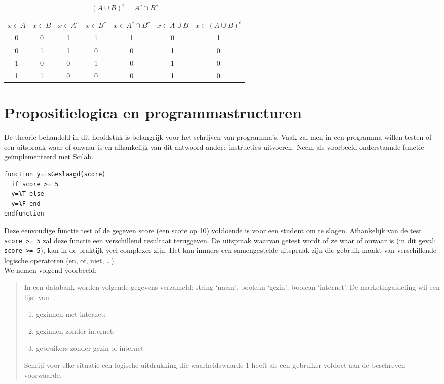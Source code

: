 \begin{table}
\caption{$(A\cup B)^c=A^c\cap B^c$} \label{tbl:gelijkeVerzamelingen}
\begin{tabular}{ccccccc}
\toprule
$x\in A$ & $x\in B$ & $x\in A^c$ & $x\in B^c$ & $x\in A^c\cap B^c$ & $x\in A\cup B$ & $x\in (A\cup B)^c$ \\ 
\midrule
0 & 0 & 1 & 1 & 1 & 0 & 1 \\ 
0 & 1 & 1 & 0 & 0 & 1 & 0 \\ 
1 & 0 & 0 & 1 & 0 & 1 & 0 \\ 
1 & 1 & 0 & 0 & 0 & 1 & 0 \\ 
\bottomrule
\end{tabular} 
\end{table}

\section{Propositielogica en programmastructuren}

De theorie behandeld in dit hoofdstuk is belangrijk voor het schrijven van programma’s. Vaak zal men in een programma willen testen of een uitspraak waar of onwaar is en afhankelijk van dit antwoord andere instructies uitvoeren.
Neem als voorbeeld onderstaande functie geïmplementeerd met Scilab.
\begin{lstlisting}
function y=isGeslaagd(score) 
  if score >= 5
  y=%T else
  y=%F end
endfunction
\end{lstlisting}
Deze eenvoudige functie test of de gegeven score (een score op 10) voldoende is voor een student om te slagen. Afhankelijk van de test \verb+score >= 5+ zal deze functie een verschillend resultaat teruggeven. De uitspraak waarvan getest wordt of ze waar of onwaar is (in dit geval: \verb+score >= 5+), kan in de praktijk veel complexer zijn. Het kan immers een samengestelde uitspraak zijn die gebruik maakt van verschillende logische operatoren (en, of, niet, \dots).\\

We nemen volgend voorbeeld:
\begin{quote}
In een databank worden volgende gegevens verzameld: string `naam', boolean `gezin', boolean `internet'. De marketingafdeling wil een lijst van 
\begin{enumerate}
\item gezinnen met internet;
\item gezinnen zonder internet;
\item gebruikers zonder gezin of internet
\end{enumerate}
Schrijf voor elke situatie een logische uitdrukking die waarheidswaarde 1 heeft als een gebruiker voldoet aan de beschreven voorwaarde.
\end{quote}


